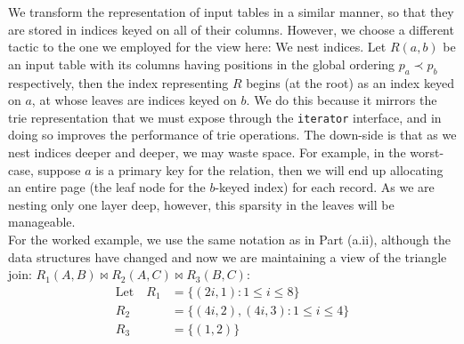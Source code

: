 We transform the representation of input tables in a similar manner, so that they are stored in indices keyed on all of their columns. However, we choose a different tactic to the one we employed for the view here: We nest indices. Let $R(a, b)$ be an input table with its columns having positions in the global ordering $p_a\prec p_b$ respectively, then the index representing $R$ begins (at the root) as an index keyed on $a$, at whose leaves are indices keyed on $b$. We do this because it mirrors the trie representation that we must expose through the \texttt{iterator} interface, and in doing so improves the performance of trie operations. The down-side is that as we nest indices deeper and deeper, we may waste space. For example, in the worst-case, suppose $a$ is a primary key for the relation, then we will end up allocating an entire page (the leaf node for the $b$-keyed index) for each record. As we are nesting only one layer deep, however, this sparsity in the leaves will be manageable.\\[1em]

For the worked example, we use the same notation as in Part (a.ii), although the data structures have changed and now we are maintaining a view of the triangle join: $R_1(A,B)\bowtie R_2(A,C)\bowtie R_3(B,C)$:
\begin{align*}
  \text{Let}\quad R_1 & = \{(2i,1):1\leq i\leq 8\}
  \\              R_2 & = \{(4i,2), (4i,3) : 1\leq i\leq 4\}
  \\              R_3 & = \{(1,2)\}
\end{align*}

\vspace{2mm}

\begin{center}
\end{center}

